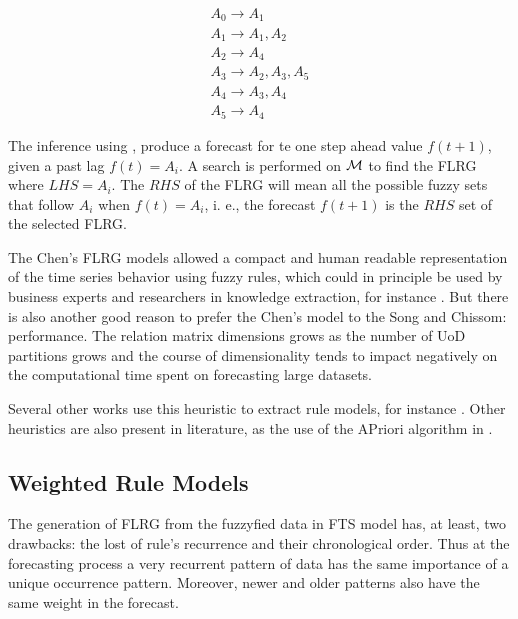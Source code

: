 \begin{equation}
\begin{array}{l}
A_0 \rightarrow A_1 \\
A_1 \rightarrow A_1, A_2 \\
A_2 \rightarrow A_4 \\
A_3 \rightarrow A_2,A_3,A_5 \\
A_4 \rightarrow A_3, A_4 \\
A_5 \rightarrow A_4 
\end{array}
\label{equ:chen_flrg}
\end{equation}

The inference using \cite{chen1996forecasting}, produce a forecast for te one step ahead value $f(t+1)$, given a past lag $f(t) = A_i$. A search is performed on $\mathcal{M}$ to find the FLRG where $LHS = A_i$. The $RHS$ of the FLRG will mean all the possible fuzzy sets that follow $A_i$ when $f(t) = A_i$, i. e., the forecast $f(t+1)$ is the $RHS$ set of  the selected FLRG.

The Chen's FLRG models allowed a compact and human readable representation of the time series behavior using fuzzy rules, which could in principle be used by business experts and researchers in knowledge extraction, for instance   \cite{Lee2006}. But there is also another good reason to prefer the Chen's model to the Song and Chissom: performance. The relation matrix dimensions grows as the number of UoD partitions grows and the course of dimensionality tends to impact negatively on the computational time spent on forecasting large datasets. 

Several other works use this heuristic to extract rule models, for instance \cite{Chen2002, Huarng2004, Lee2006, Li2008b, Hsu2010, Bahrepour2011, Huang2011, Sun2015, Sadaei2016, Lee2017, Yang2017,  Bose2017, CarvalhoJr2017}. Other heuristics are also present in literature, as the use of the APriori algorithm in \cite{Cheng2018}.

%

\subsection{Weighted Rule Models}
\label{sec:fts_weighted}

The generation of FLRG from the fuzzyfied data in  FTS model has, at least, two drawbacks: the lost of rule's recurrence and their chronological order. Thus at the forecasting process a very recurrent pattern of data has the same importance of a unique occurrence pattern. Moreover, newer and older patterns also have the same weight in the forecast. 

